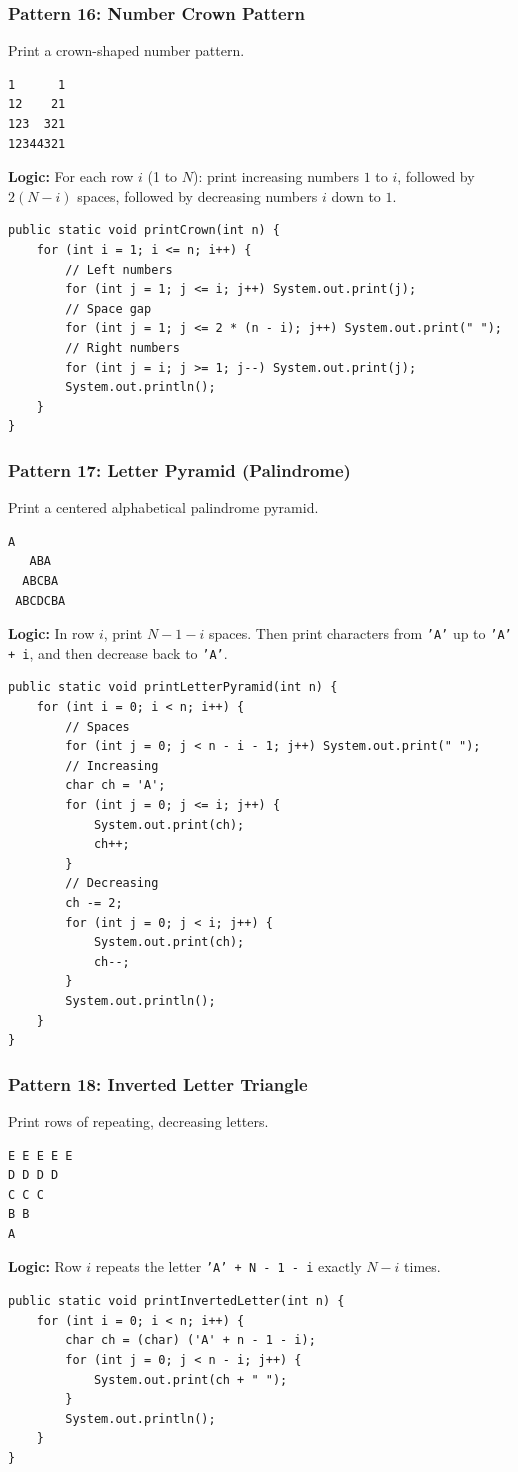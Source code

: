 \documentclass[12pt,a4paper,oneside]{book}
\begin{document}
\subsubsection{Pattern 16: Number Crown Pattern}
Print a crown-shaped number pattern.
\begin{lstlisting}[frame=single]
1      1
12    21
123  321
12344321
\end{lstlisting}
\textbf{Logic:} For each row $i$ (1 to $N$): print increasing numbers $1$ to $i$, followed by $2(N-i)$ spaces, followed by decreasing numbers $i$ down to $1$.
\begin{lstlisting}[caption={Number Crown Pattern}]
public static void printCrown(int n) {
    for (int i = 1; i <= n; i++) {
        // Left numbers
        for (int j = 1; j <= i; j++) System.out.print(j);
        // Space gap
        for (int j = 1; j <= 2 * (n - i); j++) System.out.print(" ");
        // Right numbers
        for (int j = i; j >= 1; j--) System.out.print(j);
        System.out.println();
    }
}
\end{lstlisting}

\subsubsection{Pattern 17: Letter Pyramid (Palindrome)}
Print a centered alphabetical palindrome pyramid.
\begin{lstlisting}[frame=single]
    A
   ABA
  ABCBA
 ABCDCBA
\end{lstlisting}
\textbf{Logic:} In row $i$, print $N-1-i$ spaces. Then print characters from \texttt{'A'} up to \texttt{'A' + i}, and then decrease back to \texttt{'A'}.
\begin{lstlisting}[caption={Letter Pyramid}]
public static void printLetterPyramid(int n) {
    for (int i = 0; i < n; i++) {
        // Spaces
        for (int j = 0; j < n - i - 1; j++) System.out.print(" ");
        // Increasing
        char ch = 'A';
        for (int j = 0; j <= i; j++) {
            System.out.print(ch);
            ch++;
        }
        // Decreasing
        ch -= 2;
        for (int j = 0; j < i; j++) {
            System.out.print(ch);
            ch--;
        }
        System.out.println();
    }
}
\end{lstlisting}

\subsubsection{Pattern 18: Inverted Letter Triangle}
Print rows of repeating, decreasing letters.
\begin{lstlisting}[frame=single]
E E E E E
D D D D
C C C
B B
A
\end{lstlisting}
\textbf{Logic:} Row $i$ repeats the letter \texttt{'A' + N - 1 - i} exactly $N - i$ times.
\begin{lstlisting}[caption={Inverted Letter Triangle}]
public static void printInvertedLetter(int n) {
    for (int i = 0; i < n; i++) {
        char ch = (char) ('A' + n - 1 - i);
        for (int j = 0; j < n - i; j++) {
            System.out.print(ch + " ");
        }
        System.out.println();
    }
}
\end{lstlisting}
\end{document}
